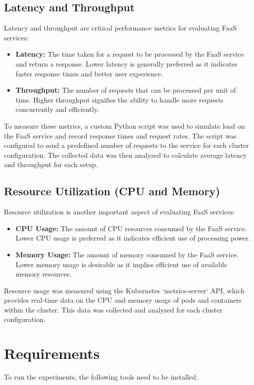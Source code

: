 \documentclass{article}
\begin{document}
\subsection{Latency and Throughput}
Latency and throughput are critical performance metrics for evaluating FaaS services:

\begin{itemize}
    \item \textbf{Latency:} The time taken for a request to be processed by the FaaS service and return a response. Lower latency is generally preferred as it indicates faster response times and better user experience.
    \item \textbf{Throughput:} The number of requests that can be processed per unit of time. Higher throughput signifies the ability to handle more requests concurrently and efficiently.
\end{itemize}

To measure these metrics, a custom Python script was used to simulate load on
the FaaS service and record response times and request rates. The script was
configured to send a predefined number of requests to the service for each
cluster configuration. The collected data was then analyzed to calculate
average latency and throughput for each setup.

\subsection{Resource Utilization (CPU and Memory)}
Resource utilization is another important aspect of evaluating FaaS services:

\begin{itemize}
    \item \textbf{CPU Usage:} The amount of CPU resources consumed by the FaaS service. Lower CPU usage is preferred as it indicates efficient use of processing power.
    \item \textbf{Memory Usage:} The amount of memory consumed by the FaaS service. Lower memory usage is desirable as it implies efficient use of available memory resources.
\end{itemize}

Resource usage was measured using the Kubernetes `metrics-server` API, which provides real-time data on the CPU and memory usage of pods and containers within the cluster. This data was collected and analyzed for each cluster configuration.
\newpage
\section{Requirements}
To run the experiments, the following tools need to be installed:
\end{document}
